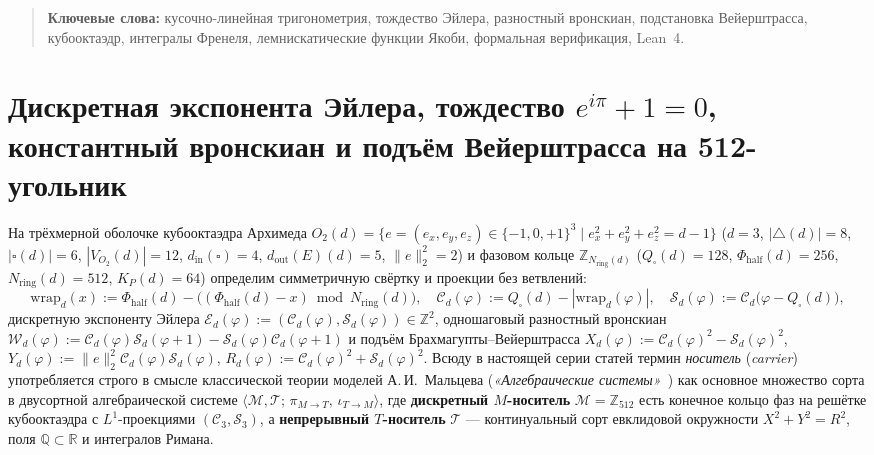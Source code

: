 \documentclass[11pt,a4paper]{article}
\theoremstyle{plain}
\theoremstyle{definition}
\begin{document}
\begin{abstract}
\medskip\noindent
\textbf{Ключевые слова:} кусочно-линейная тригонометрия, тождество Эйлера, разностный вронскиан, подстановка Вейерштрасса, кубооктаэдр, интегралы Френеля, лемнискатические функции Якоби, формальная верификация, Lean~4.
\end{abstract}

\section{Дискретная экспонента Эйлера, тождество \texorpdfstring{$e^{i\pi}+1=0$}{e\^{}(i pi)+1=0}, константный вронскиан и подъём Вейерштрасса на 512-угольник}
\label{sec:wronskian-euler}

На трёхмерной оболочке кубооктаэдра Архимеда $O_2(d) = \{e=(e_x,e_y,e_z)\in\{-1,0,+1\}^3 \mid e_x^2+e_y^2+e_z^2 = d-1\}$ ($d=3$, $|{\triangle}(d)|=8$, $|\square(d)|=6$, $|V_{O_2}(d)|=12$, $d_{\mathrm{in}}(\square)=4$, $d_{\mathrm{out}}(E)(d)=5$, $\|e\|_2^2=2$) и фазовом кольце $\mathbb{Z}_{N_{\mathrm{ring}}(d)}$ ($Q_\square(d)=128$, $\Phi_{\mathrm{half}}(d)=256$, $N_{\mathrm{ring}}(d)=512$, $K_P(d)=64$) определим симметричную свёртку и проекции без ветвлений:
\begin{equation}
  \label{eq:proj-cs}
  \mathrm{wrap}_d(x) := \Phi_{\mathrm{half}}(d) - \bigl((\Phi_{\mathrm{half}}(d) - x) \bmod N_{\mathrm{ring}}(d)\bigr),\quad
  \mathcal{C}_d(\varphi) := Q_\square(d) - |\mathrm{wrap}_d(\varphi)|,\quad
  \mathcal{S}_d(\varphi) := \mathcal{C}_d\bigl(\varphi - Q_\square(d)\bigr),
\end{equation}
дискретную экспоненту Эйлера $\mathcal{E}_d(\varphi) := (\mathcal{C}_d(\varphi),\mathcal{S}_d(\varphi))\in\mathbb{Z}^2$, одношаговый разностный вронскиан $\mathcal{W}_d(\varphi) := \mathcal{C}_d(\varphi)\mathcal{S}_d(\varphi+1) - \mathcal{S}_d(\varphi)\mathcal{C}_d(\varphi+1)$ и подъём Брахмагупты--Вейерштрасса $X_d(\varphi) := \mathcal{C}_d(\varphi)^2 - \mathcal{S}_d(\varphi)^2$, $Y_d(\varphi) := \|e\|_2^2\mathcal{C}_d(\varphi)\mathcal{S}_d(\varphi)$, $R_d(\varphi) := \mathcal{C}_d(\varphi)^2 + \mathcal{S}_d(\varphi)^2$. Всюду в настоящей серии статей термин \emph{носитель} (\emph{carrier}) употребляется строго в смысле классической теории моделей А.\,И.~Мальцева (\emph{«Алгебраические системы»}~\cite{Malcev1970}) как основное множество сорта в двусортной алгебраической системе $\langle\mathcal{M},\mathcal{T};\,\pi_{M\to T},\,\iota_{T\to M}\rangle$, где \textbf{дискретный $M$-носитель} $\mathcal{M}=\mathbb{Z}_{512}$ есть конечное кольцо фаз на решётке кубооктаэдра с $L^1$-проекциями $(\mathcal{C}_3,\mathcal{S}_3)$, а \textbf{непрерывный $T$-носитель} $\mathcal{T}$ --- континуальный сорт евклидовой окружности $X^2+Y^2=R^2$, поля $\mathbb{Q}\subset\mathbb{R}$ и интегралов Римана.
\end{document}
